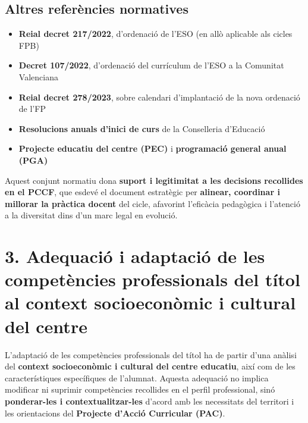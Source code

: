 \documentclass[
  paper=a4,
  ,captions=tableheading
]{scrartcl}
\providecommand{\tightlist}{%
  \setlength{\itemsep}{0pt}\setlength{\parskip}{0pt}}
\begin{document}
\hypertarget{altres-referuxe8ncies-normatives}{%
\subsection{Altres referències
normatives}\label{altres-referuxe8ncies-normatives}}

\begin{itemize}
\tightlist
\item
  \textbf{Reial decret 217/2022}, d'ordenació de l'ESO (en allò
  aplicable als cicles FPB)
\item
  \textbf{Decret 107/2022}, d'ordenació del currículum de l'ESO a la
  Comunitat Valenciana
\item
  \textbf{Reial decret 278/2023}, sobre calendari d'implantació de la
  nova ordenació de l'FP
\item
  \textbf{Resolucions anuals d'inici de curs} de la Conselleria
  d'Educació
\item
  \textbf{Projecte educatiu del centre (PEC)} i \textbf{programació
  general anual (PGA)}
\end{itemize}

Aquest conjunt normatiu dona \textbf{suport i legitimitat a les
decisions recollides en el PCCF}, que esdevé el document estratègic per
\textbf{alinear, coordinar i millorar la pràctica docent} del cicle,
afavorint l'eficàcia pedagògica i l'atenció a la diversitat dins d'un
marc legal en evolució.

\hypertarget{adequaciuxf3-i-adaptaciuxf3-de-les-competuxe8ncies-professionals-del-tuxedtol-al-context-socioeconuxf2mic-i-cultural-del-centre}{%
\section{3. Adequació i adaptació de les competències professionals del
títol al context socioeconòmic i cultural del
centre}\label{adequaciuxf3-i-adaptaciuxf3-de-les-competuxe8ncies-professionals-del-tuxedtol-al-context-socioeconuxf2mic-i-cultural-del-centre}}

L'adaptació de les competències professionals del títol ha de partir
d'una anàlisi del \textbf{context socioeconòmic i cultural del centre
educatiu}, així com de les característiques específiques de l'alumnat.
Aquesta adequació no implica modificar ni suprimir competències
recollides en el perfil professional, sinó \textbf{ponderar-les i
contextualitzar-les} d'acord amb les necessitats del territori i les
orientacions del \textbf{Projecte d'Acció Curricular (PAC)}.
\end{document}
